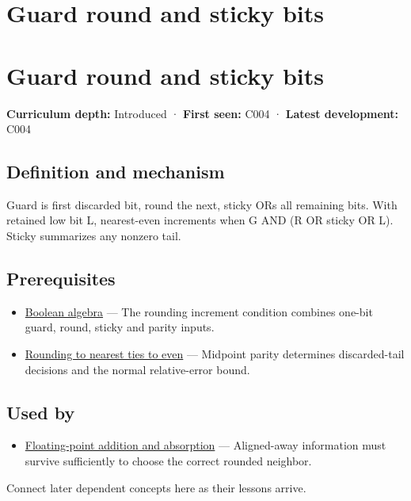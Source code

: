 \hypertarget{appendix-b572b631069b}{}
\section*{Guard round and sticky bits}
\section{Guard round and sticky bits}\label{guard-round-and-sticky-bits}

\textbf{Curriculum depth:} Introduced · \textbf{First seen:} C004 · \textbf{Latest development:} C004

\subsection{Definition and mechanism}\label{definition-and-mechanism}

Guard is first discarded bit, round the next, sticky ORs all remaining bits. With retained low bit L, nearest-even increments when G AND (R OR sticky OR L). Sticky summarizes any nonzero tail.

\subsection{Prerequisites}\label{prerequisites}

\begin{itemize}
\tightlist
\item
  \hyperref[appendix-24475e1596a8]{Boolean algebra} --- The rounding increment condition combines one-bit guard, round, sticky and parity inputs.
\item
  \hyperref[appendix-614afe1de592]{Rounding to nearest ties to even} --- Midpoint parity determines discarded-tail decisions and the normal relative-error bound.
\end{itemize}

\subsection{Used by}\label{used-by}

\begin{itemize}
\tightlist
\item
  \hyperref[appendix-a1b1b4580dfd]{Floating-point addition and absorption} --- Aligned-away information must survive sufficiently to choose the correct rounded neighbor.
\end{itemize}

Connect later dependent concepts here as their lessons arrive.

